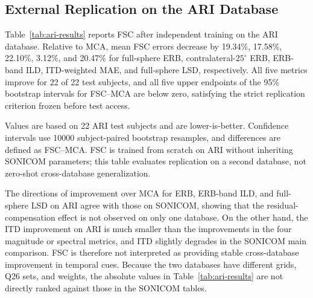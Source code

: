 \documentclass[UTF8,a4paper]{article}
\begin{document}
\FloatBarrier
\subsection{External Replication on the ARI Database}
\label{sec:ari-replication}

Table~\ref{tab:ari-results} reports FSC after independent training on the ARI database. Relative to MCA, mean FSC errors decrease by 19.34\%, 17.58\%, 22.10\%, 3.12\%, and 20.47\% for full-sphere ERB, contralateral-$25^\circ$ ERB, ERB-band ILD, ITD-weighted MAE, and full-sphere LSD, respectively. All five metrics improve for 22 of 22 test subjects, and all five upper endpoints of the 95\% bootstrap intervals for FSC--MCA are below zero, satisfying the strict replication criterion frozen before test access.

\begin{table}[htbp]
\centering\small
\setlength{\tabcolsep}{3.2pt}
\caption{Five reported metrics of FSC and MCA on the external ARI database}
\label{tab:ari-results}
\par\smallskip
\parbox{\linewidth}{\footnotesize Values are based on 22 ARI test subjects and are lower-is-better. Confidence intervals use 10000 subject-paired bootstrap resamples, and differences are defined as FSC--MCA. FSC is trained from scratch on ARI without inheriting SONICOM parameters; this table evaluates replication on a second database, not zero-shot cross-database generalization.}
\end{table}

The directions of improvement over MCA for ERB, ERB-band ILD, and full-sphere LSD on ARI agree with those on SONICOM, showing that the residual-compensation effect is not observed on only one database. On the other hand, the ITD improvement on ARI is much smaller than the improvements in the four magnitude or spectral metrics, and ITD slightly degrades in the SONICOM main comparison. FSC is therefore not interpreted as providing stable cross-database improvement in temporal cues. Because the two databases have different grids, Q26 sets, and weights, the absolute values in Table~\ref{tab:ari-results} are not directly ranked against those in the SONICOM tables.
\end{document}
